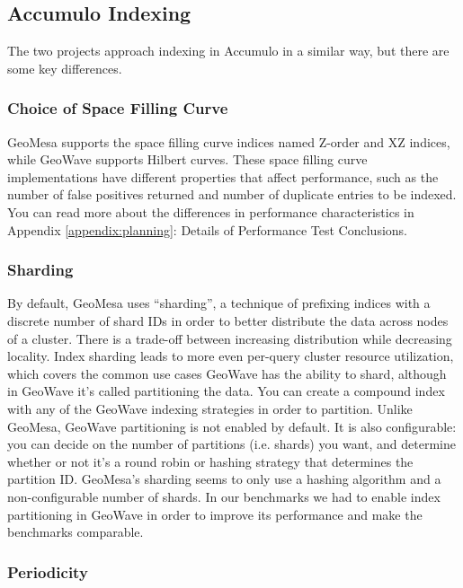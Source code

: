 \subsection{Accumulo Indexing}
\label{sec:featurecompare:indexing}

The two projects approach indexing in Accumulo in a similar way, but there are some key differences.

\subsubsection{Choice of Space Filling Curve}
\label{sec:featurecompare:indexing:curve}

GeoMesa supports the space filling curve indices named Z-order and XZ indices, while GeoWave supports Hilbert curves.
These space filling curve implementations have different properties that affect performance, such as the number of false positives returned and number of duplicate entries to be indexed.
You can read more about the differences in performance characteristics in Appendix \ref{appendix:planning}: Details of Performance Test Conclusions.

\subsubsection{Sharding}
\label{sec:featurecompare:indexing:sharding}

By default, GeoMesa uses ``sharding'', a technique of prefixing indices with a discrete number of shard IDs in order to better distribute the data across nodes of a cluster.
There is a trade-off between increasing distribution while decreasing locality.
Index sharding leads to more even per-query cluster resource utilization, which covers the common use cases GeoWave has the ability to shard, although in GeoWave it's called partitioning the data.
You can create a compound index with any of the GeoWave indexing strategies in order to partition.
Unlike GeoMesa, GeoWave partitioning is not enabled by default.
It is also configurable: you can decide on the number of partitions (i.e. shards) you want, and determine whether or not it's a round robin or hashing strategy that determines the partition ID.
GeoMesa's sharding seems to only use a hashing algorithm and a non-configurable number of shards.
In our benchmarks we had to enable index partitioning in GeoWave in order to improve its performance and make the benchmarks comparable.

\subsubsection{Periodicity}
\label{sec:featurecompare:indexing:periodicity}

